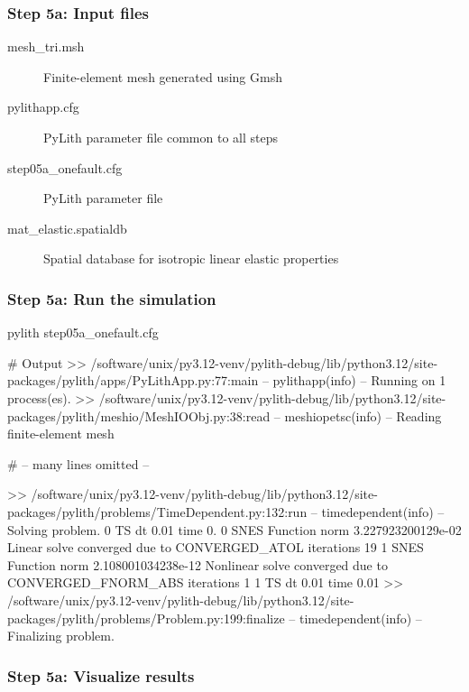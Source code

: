 \documentclass[aspectratio=169]{beamer}
\begin{document}
\begin{frame}
  \frametitle{Step 5a: Input files}
  \summary{}

  \begin{description}
  \item[mesh\_tri.msh] Finite-element mesh generated using Gmsh
  \item[pylithapp.cfg] PyLith parameter file common to all steps
  \item[step05a\_onefault.cfg] PyLith parameter file
  \item[mat\_elastic.spatialdb] Spatial database for isotropic linear elastic properties
  \end{description}
    
\end{frame}


\begin{frame}[fragile]
  \frametitle{Step 5a: Run the simulation}
  \summary{}

\begin{bashcode}
pylith step05a_onefault.cfg

# Output
 >> /software/unix/py3.12-venv/pylith-debug/lib/python3.12/site-packages/pylith/apps/PyLithApp.py:77:main
 -- pylithapp(info)
 -- Running on 1 process(es).
 >> /software/unix/py3.12-venv/pylith-debug/lib/python3.12/site-packages/pylith/meshio/MeshIOObj.py:38:read
 -- meshiopetsc(info)
 -- Reading finite-element mesh

# -- many lines omitted --

 >> /software/unix/py3.12-venv/pylith-debug/lib/python3.12/site-packages/pylith/problems/TimeDependent.py:132:run
 -- timedependent(info)
 -- Solving problem.
0 TS dt 0.01 time 0.
    0 SNES Function norm 3.227923200129e-02
      Linear solve converged due to CONVERGED_ATOL iterations 19
    1 SNES Function norm 2.108001034238e-12
    Nonlinear solve converged due to CONVERGED_FNORM_ABS iterations 1
1 TS dt 0.01 time 0.01
 >> /software/unix/py3.12-venv/pylith-debug/lib/python3.12/site-packages/pylith/problems/Problem.py:199:finalize
 -- timedependent(info)
 -- Finalizing problem.
\end{bashcode}
  
\end{frame}


\begin{frame}
  \frametitle{Step 5a: Visualize results}

    
\end{frame}
\end{document}
